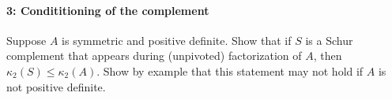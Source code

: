\documentclass[12pt, leqno]{article} %
\begin{document}
\paragraph*{3: Condititioning of the complement}
Suppose $A$ is symmetric and positive definite.  Show that if $S$ is a
Schur complement that appears during (unpivoted) factorization of $A$, then
$\kappa_2(S) \leq \kappa_2(A)$.  Show by example that this statement
may not hold if $A$ is not positive definite.
\end{document}

